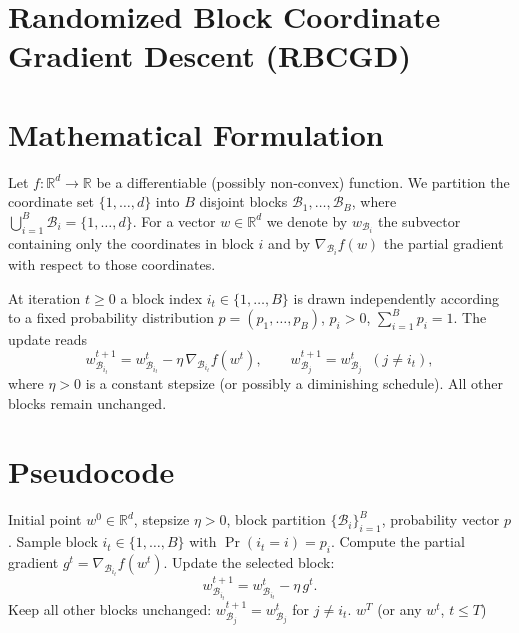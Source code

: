 \documentclass{article}
\newcommand{\R}{\mathbb{R}}
\begin{document}
\section*{Randomized Block Coordinate Gradient Descent (RBCGD)}

\section*{Mathematical Formulation}
Let $f:\R^{d}\to\R$ be a differentiable (possibly non‑convex) function.
We partition the coordinate set $\{1,\dots ,d\}$ into $B$ disjoint blocks
$\mathcal{B}_{1},\dots ,\mathcal{B}_{B}$, where $\bigcup_{i=1}^{B}\mathcal{B}_{i}=\{1,\dots ,d\}$.
For a vector $w\in\R^{d}$ we denote by $w_{\mathcal{B}_{i}}$ the subvector
containing only the coordinates in block $i$ and by $\nabla_{\mathcal{B}_{i}}f(w)$ the
partial gradient with respect to those coordinates.

At iteration $t\ge 0$ a block index $i_{t}\in\{1,\dots ,B\}$ is drawn
independently according to a fixed probability distribution
$p=(p_{1},\dots ,p_{B})$, $p_{i}>0$, $\sum_{i=1}^{B}p_{i}=1$.
The update reads
\[
w^{t+1}_{\mathcal{B}_{i_{t}}}= w^{t}_{\mathcal{B}_{i_{t}}}
      -\eta\,\nabla_{\mathcal{B}_{i_{t}}}f\!\left(w^{t}\right),\qquad
w^{t+1}_{\mathcal{B}_{j}} = w^{t}_{\mathcal{B}_{j}}\;\;(j\neq i_{t}),
\tag{1}
\]
where $\eta>0$ is a constant stepsize (or possibly a diminishing schedule).
All other blocks remain unchanged.

\section*{Pseudocode}
\begin{algorithm}[H]
\caption{Randomized Block Coordinate Gradient Descent}
\begin{algorithmic}[1]
\REQUIRE Initial point $w^{0}\in\R^{d}$, stepsize $\eta>0$, block
partition $\{\mathcal{B}_{i}\}_{i=1}^{B}$, probability vector $p$.
    \STATE Sample block $i_{t}\in\{1,\dots ,B\}$ with $\Pr(i_{t}=i)=p_{i}$.
    \STATE Compute the partial gradient $g^{t}= \nabla_{\mathcal{B}_{i_{t}}}f(w^{t})$.
    \STATE Update the selected block:
    \[
    w^{t+1}_{\mathcal{B}_{i_{t}}}= w^{t}_{\mathcal{B}_{i_{t}}}-\eta\, g^{t}.
    \]
    \STATE Keep all other blocks unchanged:
    $w^{t+1}_{\mathcal{B}_{j}}=w^{t}_{\mathcal{B}_{j}}$ for $j\neq i_{t}$.
\ENDFOR
\RETURN $w^{T}$ (or any $w^{t}$, $t\le T$)
\end{algorithmic}
\end{algorithm}
\end{document}
